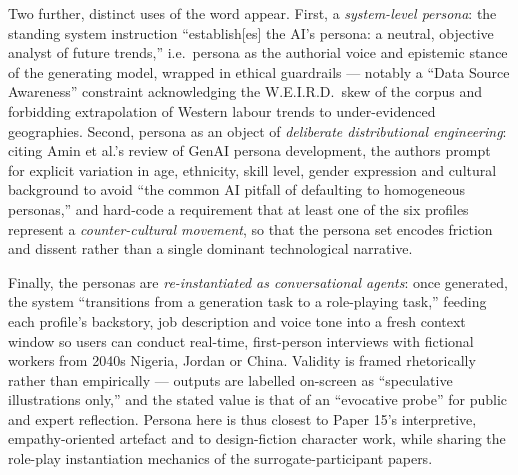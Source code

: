 Two further, distinct uses of the word appear. First, a \emph{system-level persona}: the standing system instruction ``establish[es] the AI's persona: a neutral, objective analyst of future trends,'' i.e.\ persona as the authorial voice and epistemic stance of the generating model, wrapped in ethical guardrails --- notably a ``Data Source Awareness'' constraint acknowledging the W.E.I.R.D.\ skew of the corpus and forbidding extrapolation of Western labour trends to under-evidenced geographies. Second, persona as an object of \emph{deliberate distributional engineering}: citing Amin et al.'s review of GenAI persona development, the authors prompt for explicit variation in age, ethnicity, skill level, gender expression and cultural background to avoid ``the common AI pitfall of defaulting to homogeneous personas,'' and hard-code a requirement that at least one of the six profiles represent a \emph{counter-cultural movement}, so that the persona set encodes friction and dissent rather than a single dominant technological narrative.

Finally, the personas are \emph{re-instantiated as conversational agents}: once generated, the system ``transitions from a generation task to a role-playing task,'' feeding each profile's backstory, job description and voice tone into a fresh context window so users can conduct real-time, first-person interviews with fictional workers from 2040s Nigeria, Jordan or China. Validity is framed rhetorically rather than empirically --- outputs are labelled on-screen as ``speculative illustrations only,'' and the stated value is that of an ``evocative probe'' for public and expert reflection. Persona here is thus closest to Paper 15's interpretive, empathy-oriented artefact and to design-fiction character work, while sharing the role-play instantiation mechanics of the surrogate-participant papers.


